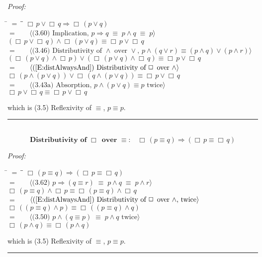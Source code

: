 \documentclass[fleqn, leqno]{article}
\newcommand{\lgap}{2pt}                             %
\newcommand{\mymathindent}{24pt}                    %
\newcommand{\equivs}{\ensuremath{\;\equiv\;}}       %
\newcommand{\impl}{\ensuremath{\Rightarrow}}        %
\newcommand{\Always}{\Box\,}
\newcommand{\myqed}{\rule[-.23ex]{1.2ex}{2.0ex}}
\newcommand{\myqedtab}{\hspace{388.5pt}}              %
\newcommand{\Gll} {\langle}                         %
\newcommand{\Ggg} {\rangle}                         %
\newcommand{\Hint}[1]     {\ \ \ $\Gll              \mbox{#1} \Ggg$ }   %
\begin{document}
\emph{Proof:}
\begin{tabbing}
\hspace{\mymathindent} \= $= \;$ \= \myqedtab \= \kill
  \> \>   $\Always p \lor \Always q \impl \Always(p \lor q)$\\[\lgap]
  \> $=$  \>  \Hint{(3.60) Implication, $p\impl q \equivs p\land q \equivs p$}\\[\lgap]
  \> \>   $(\Always p \lor \Always q) \land \Always(p \lor q) \equiv \Always p \lor \Always q$\\[\lgap]
  \> $=$  \>  \Hint{(3.46) Distributivity of $\land$ over $\lor$, $p\land (q\lor r)\equiv (p\land q)\lor (p\land r)$}\\[\lgap]
  \> \>   $(\Always (p \lor q) \land \Always p) \lor (\Always (p \lor q) \land \Always q) \equiv \Always p \lor \Always q$\\[\lgap]
  \> $=$  \>  \Hint{(\ref{E:distAlwaysAnd}) Distributivity of $\Always$ over $\land$}\\[\lgap]
  \> \>   $\Always(p \land (p \lor q)) \lor \Always(q \land (p \lor q)) \equiv \Always p \lor \Always q$\\[\lgap]
  \> $=$  \>  \Hint{(3.43a) Absorption, $p \land (p \lor q) \equiv p$ twice}\\[\lgap]
  \> \>   $\Always p \lor \Always q \equiv \Always p \lor \Always q$
\end{tabbing}
which is (3.5) Reflexivity of $\equiv$, $p\equiv p$. \hfill \myqed\\[\lgap]

\begin{equation}\label{E:distAlwaysEquiv}
\textbf{Distributivity of $\Always$ over $\equiv$:}\quad \Always (p \equiv q) \impl (\Always p \equiv \Always q)
\end{equation}

\emph{Proof:}
\begin{tabbing}
\hspace{\mymathindent} \= $= \;$ \= \myqedtab \= \kill
  \> \>   $\Always (p \equiv q) \impl (\Always p \equiv \Always q)$\\[\lgap]
  \> $=$  \>  \Hint{(3.62) $p\impl (q\equiv r) \equivs p\land q\equivs p\land r$}\\[\lgap]
  \> \>   $\Always (p \equiv q) \land \Always p \equiv \Always (p \equiv q) \land \Always q$\\[\lgap]
  \> $=$  \>  \Hint{(\ref{E:distAlwaysAnd}) Distributivity of $\Always$ over $\land$, twice}\\[\lgap]
  \> \>   $\Always((p \equiv q) \land p) \equiv \Always((p \equiv q) \land q)$\\[\lgap]
  \> $=$  \>  \Hint{(3.50) $p\land (q\equiv p)\equivs p\land q$ twice}\\[\lgap]
  \> \>   $\Always(p \land q) \equiv \Always (p \land q)$
\end{tabbing}
which is (3.5) Reflexivity of $\equiv$, $p\equiv p$. \hfill \myqed\\[\lgap]
\end{document}
